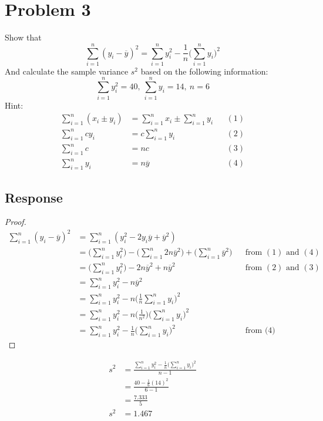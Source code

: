 \documentclass[13pt]{article}
\begin{document}
\newpage
\section*{Problem 3}
Show that
\[\sum_{i = 1}^{n} (y_i - \overline{y})^2 = \sum_{i = 1}^{n} y_i^2 - \frac{1}{n} \bigg(\sum_{i = 1}^{n} y_i\bigg)^2\]
And calculate the sample variance $s^2$ based on the following information:
\[\sum_{i = 1}^{n} y_i^2 = 40, \ \sum_{i = 1}^{n} y_i = 14, \ n = 6\]
Hint:
\begin{align*}
  \sum_{i = 1}^{n} (x_i \pm y_i) &= \sum_{i = 1}^{n} x_i \pm \sum_{i = 1}^{n} y_i && (1) \\
  \sum_{i = 1}^{n} cy_i &= c \sum_{i = 1}^{n} y_i && (2) \\
  \sum_{i = 1}^{n} c &= nc && (3) \\
  \sum_{i = 1}^{n} y_i &= n\overline{y} && (4)
\end{align*}
\subsection*{Response}
\begin{proof}
  \begin{align*}
    \sum_{i = 1}^{n} (y_i - \overline{y})^2 &= \sum_{i = 1}^{n} (y_i^2 - 2y_i\overline{y} + \overline{y}^2) \\
                                            &= \bigg(\sum_{i = 1}^{n} y_i^2\bigg) - \bigg(\sum_{i = 1}^{n}
                                              2n\overline{y}^2\bigg) + \bigg(\sum_{i = 1}^{n} \overline{y}^2\bigg) 
                                            && \text{from } (1) \text{ and } (4) \\
                                            &= \bigg(\sum_{i = 1}^{n} y_i^2\bigg) - 2n\overline{y}^2 + n\overline{y}^2 
                                            && \text{from } (2) \text{ and } (3)\\
                                            &= \sum_{i = 1}^{n} y_i^2 - n\overline{y}^2 \\
                                            &= \sum_{i = 1}^{n} y_i^2 - n\bigg(\frac{1}{n}
                                              \sum_{i = 1}^{n} y_i\bigg)^2 \\
                                            &= \sum_{i = 1}^{n} y_i^2 - n\bigg(\frac{1}{n^2}\bigg)\bigg(
                                              \sum_{i = 1}^{n} y_i\bigg)^2 \\
                                            &= \sum_{i = 1}^{n} y_i^2 - \frac{1}{n}\bigg(\sum_{i = 1}^{n} y_i\bigg)^2
                                            && \text{from (4)}
  \end{align*}
\end{proof}
\begin{align*}
  s^2 &= \frac{\sum_{i = 1}^{n} y_i^2 - \frac{1}{n} \bigg(\sum_{i = 1}^{n} y_i\bigg)^2}{n - 1} \\
      &= \frac{40 - \frac{1}{6} (14)^2}{6 - 1} \\
      &= \frac{7.333}{5} \\
  s^2 &= 1.467
\end{align*}
\end{document}
